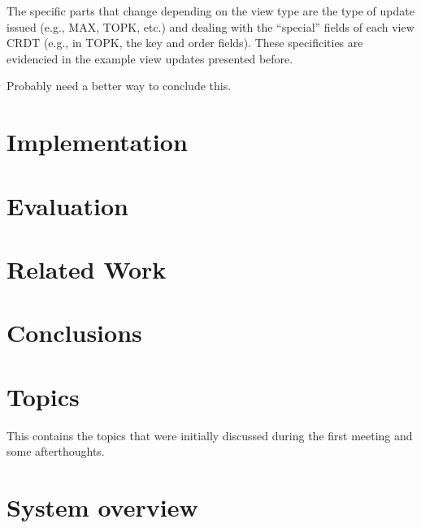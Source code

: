 \documentclass{vldb}
\newcommand{\grumbler}[2]{{\color{red}{\bf #1:} #2}}
\newcommand{\andre}[1]{\grumbler{andre}{#1}}
\begin{document}
The specific parts that change depending on the view type are the type of update issued (e.g., MAX, TOPK, etc.) and dealing with the ``special'' fields of each view CRDT (e.g., in TOPK, the key and order fields).
These specificities are evidencied in the example view updates presented before.

\andre{Probably need a better way to conclude this.}









\section{Implementation}

\section{Evaluation}

\section{Related Work}

\section{Conclusions}




\null\newpage\null

\null\newpage\null

\section{Topics}

This contains the topics that were initially discussed during the first meeting and some afterthoughts.

\section{System overview}
\end{document}
